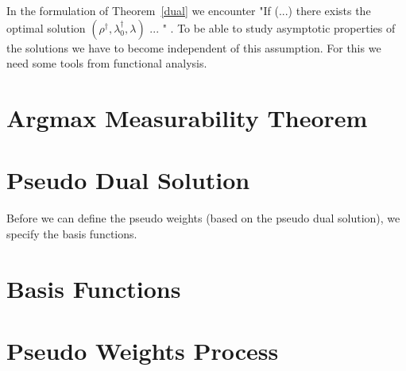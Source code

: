 In the formulation of Theorem~\ref{dual} we encounter "If (...) there exists the optimal solution $(\rho^\dagger,\lambda_0^\dagger,\lambda)$ ... " .
To be able to study asymptotic properties of the solutions we have to become independent of this assumption.
For this we need some tools from functional analysis.
\section{Argmax Measurability Theorem}

\section{Pseudo Dual Solution}

Before we can define the pseudo weights (based on the pseudo dual solution), we specify the basis functions.
\section{Basis Functions}

\section{Pseudo Weights Process}


